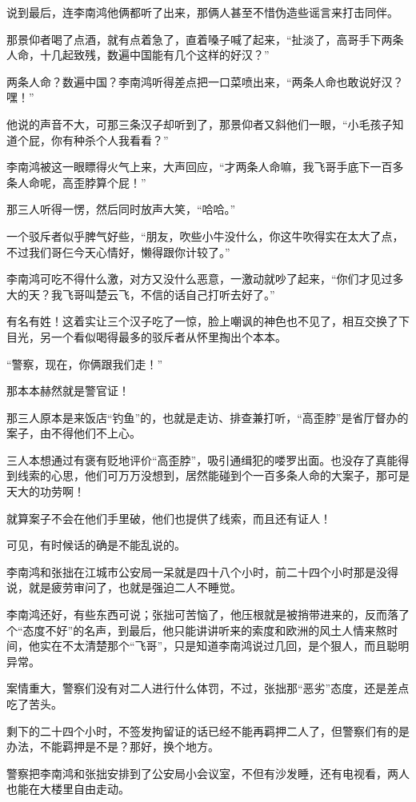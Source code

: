 说到最后，连李南鸿他俩都听了出来，那俩人甚至不惜伪造些谣言来打击同伴。

那景仰者喝了点酒，就有点着急了，直着嗓子喊了起来，“扯淡了，高哥手下两条人命，十几起致残，数遍中国能有几个这样的好汉？”

两条人命？数遍中国？李南鸿听得差点把一口菜喷出来，“两条人命也敢说好汉？嘿！”

他说的声音不大，可那三条汉子却听到了，那景仰者又斜他们一眼，“小毛孩子知道个屁，你有种杀个人我看看？”

李南鸿被这一眼瞟得火气上来，大声回应，“才两条人命嘛，我飞哥手底下一百多条人命呢，高歪脖算个屁！”

那三人听得一愣，然后同时放声大笑，“哈哈。”

一个驳斥者似乎脾气好些，“朋友，吹些小牛没什么，你这牛吹得实在太大了点，不过我们哥仨今天心情好，懒得跟你计较了。”

李南鸿可吃不得什么激，对方又没什么恶意，一激动就吵了起来，“你们才见过多大的天？我飞哥叫楚云飞，不信的话自己打听去好了。”

有名有姓！这着实让三个汉子吃了一惊，脸上嘲讽的神色也不见了，相互交换了下目光，另一个看似喝得最多的驳斥者从怀里掏出个本本。

“警察，现在，你俩跟我们走！”

那本本赫然就是警官证！

那三人原本是来饭店“钓鱼”的，也就是走访、排查兼打听，“高歪脖”是省厅督办的案子，由不得他们不上心。

三人本想通过有褒有贬地评价“高歪脖”，吸引通缉犯的喽罗出面。也没存了真能得到线索的心思，他们可万万没想到，居然能碰到个一百多条人命的大案子，那可是天大的功劳啊！

就算案子不会在他们手里破，他们也提供了线索，而且还有证人！

可见，有时候话的确是不能乱说的。

李南鸿和张拙在江城市公安局一呆就是四十八个小时，前二十四个小时那是没得说，就是疲劳审问了，也就是强迫二人不睡觉。

李南鸿还好，有些东西可说；张拙可苦恼了，他压根就是被捎带进来的，反而落了个“态度不好”的名声，到最后，他只能讲讲听来的索度和欧洲的风土人情来熬时间，他实在不太清楚那个“飞哥”，只是知道李南鸿说过几回，是个狠人，而且聪明异常。

案情重大，警察们没有对二人进行什么体罚，不过，张拙那“恶劣”态度，还是差点吃了苦头。

剩下的二十四个小时，不签发拘留证的话已经不能再羁押二人了，但警察们有的是办法，不能羁押是不是？那好，换个地方。

警察把李南鸿和张拙安排到了公安局小会议室，不但有沙发睡，还有电视看，两人也能在大楼里自由走动。

